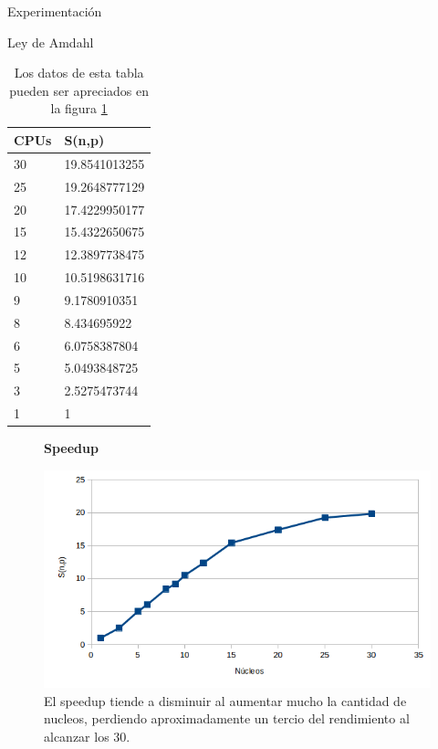 \begin{section}{Experimentación}
\begin{subsection}{Ley de Amdahl}
\begin{center}
\begin{table}[h]

    \begin{tabular}{ | l | l |}
    \hline
    CPUs & S(n,p) \\ \hline
	30 &  19.8541013255	\\ \hline
	25 &  19.2648777129	\\ \hline
	20 &  17.4229950177	\\ \hline
	15 &  15.4322650675	\\ \hline
	12 &  12.3897738475	\\ \hline
	10 &  10.5198631716	\\ \hline
	9  &  9.1780910351	\\ \hline
	8  &  8.434695922	\\ \hline
	6  &  6.0758387804	\\ \hline
	5  &  5.0493848725	\\ \hline
	3  &  2.5275473744	\\ \hline
	1  &  1	\\ \hline
    \end{tabular}
    \caption{Los datos de esta tabla pueden ser apreciados en la figura \ref{fig:exp_amdahl_speedup}}
\end{table}
\end{center}

\begin{figure}
\textbf{Speedup}\par\medskip

\includegraphics[width=.75\textwidth,height=.75\textheight,keepaspectratio]{figures/exp_amdahl_speedup}
\caption{El speedup tiende a disminuir al aumentar mucho la cantidad de nucleos, perdiendo aproximadamente un tercio del rendimiento al alcanzar los 30.}
\label{fig:exp_amdahl_speedup}

\end{figure}

\end{subsection}



\end{section}
